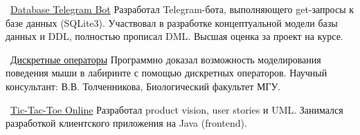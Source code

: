 \documentclass[11pt]{spidercv}
\begin{document}
\begin{MainPart}
    \Experience
        {\ColorHighlight}
		{\Large\faGithub\ \href{https://github.com/necroshine0/database-theory-proj}{Database Telegram Bot}}
            {}{}
        {   
            Разработал Telegram-бота, выполняющего get-запросы к базе данных (SQLite3). Участвовал в разработке концептуальной модели базы данных и DDL, полностью прописал DML. Высшая оценка за проект на курсе.\\
        }

    \Experience
        {\ColorHighlight}
		{\Large\faGithub\ \href{https://github.com/necroshine0/maze-proj}{Дискретные операторы}}
            {}{}
        {   
            Программно доказал возможность моделирования поведения мыши в лабиринте с помощью дискретных операторов. Научный консультант: В.В. Толченникова, Биологический факультет МГУ. \\
        }

    \Experience
        {\ColorHighlight}
		{\Large\faGithub\ \href{https://github.com/kaledinandrew/TicTacToeOnline}{Tic-Tac-Toe Online}}
            {}{}
        {   
            Разработал product vision, user stories и UML. Занимался разработкой клиентского приложения на Java (frontend).
        }

    \end{MainPart}

    
\end{document}
